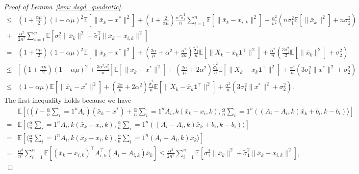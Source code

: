 \documentclass{article}
\theoremstyle{plain}
\theoremstyle{definition}
\theoremstyle{remark}
\newcommand{\E}{\mathbb{E}}
\newcommand{\T}{^{\top}}
\newcommand{\bfonet}{\mathbf{1}^{\top}}
\def\<#1,#2>{\langle #1,#2\rangle}
\begin{document}
\begin{proof}[Proof of Lemma~\ref{lem: dsgd_quadratic}]
\begin{align*}
        \leq &\left(1+\frac{\alpha\mu}{2}\right)(1-\alpha\mu)^2\E\left[\|\bar{x}_k - x^*\|^2\right] + \left(1+\frac{2}{\alpha\mu}\right)\frac{\alpha^2\tilde{\sigma}_1^2}{n}\sum_{i=1}^{n}\E\left[\|\bar{x}_k - x_{i,k}\|^2\right] + \frac{\alpha^2}{n^2}(n\sigma_1^2\E\left[\|\bar{x}_k\|^2\right] + n\sigma_2^2) \\
        + & \frac{\alpha^2}{2n^2}\sum_{i=1}^{n}\E\left[\sigma_1^2\|\bar{x}_k\|^2 + \tilde{\sigma}_1^2\|\bar{x}_k - x_{i,k}\|^2\right] \\
        = &\left(1+\frac{\alpha\mu}{2}\right)(1-\alpha\mu)^2\E\left[\|\bar{x}_k - x^*\|^2\right] + \left(\frac{2\alpha}{\mu} + \alpha^2 + \frac{\alpha^2}{2n}\right)\frac{\tilde{\sigma}_1^2}{n}\E\left[\|X_k - \bar{x}_k\bfonet\|^2\right] + \frac{\alpha^2}{n}\left(\frac{3\sigma_1^2}{2}\E\left[\|\bar{x}_k\|^2\right] + \sigma_2^2\right) \\
        \leq &\left[\left(1+\frac{\alpha\mu}{2}\right)(1-\alpha\mu)^2 + \frac{3\alpha^2\sigma_1^2}{n}\right]\E\left[\|\bar{x}_k - x^*\|^2\right] + \left(\frac{2\alpha}{\mu} + 2\alpha^2\right)\frac{\tilde{\sigma}_1^2}{n}\E\left[\|X_k - \bar{x}_k\bfonet\|^2\right] + \frac{\alpha^2}{n}(3\sigma_1^2\|x^*\|^2 + \sigma_2^2) \\
        \leq & (1-\alpha\mu)\E\left[\|\bar{x}_k - x^*\|^2\right] + \left(\frac{2\alpha}{\mu} + 2\alpha^2\right)\frac{\tilde{\sigma}_1^2}{n}\E\left[\|X_k - \bar{x}_k\bfonet\|^2\right] + \frac{\alpha^2}{n}(3\sigma_1^2\|x^*\|^2 + \sigma_2^2).
    \end{align*}
    The first inequality holds because we have
    \begin{align*}
        &\E\left[\<\left(I - \frac{\alpha}{n}\sum_{i=1}^{n}A_i\right)(\bar{x}_k - x^*) + \frac{\alpha}{n}\sum_{i=1}^{n}A_{i,k}(\bar{x}_k - x_{i,k}), \frac{\alpha}{n}\sum_{i=1}^{n}((A_i - A_{i,k})\bar{x}_k + b_{i,k} - b_i)> \right] \\
        = &\E\left[\<\frac{\alpha}{n}\sum_{i=1}^{n}A_{i,k}(\bar{x}_k - x_{i,k}), \frac{\alpha}{n}\sum_{i=1}^{n}((A_i - A_{i,k})\bar{x}_k + b_{i,k} - b_i)> \right] \\
        =& \E\left[\< \frac{\alpha}{n}\sum_{i=1}^{n}A_{i,k}(\bar{x}_k - x_{i,k}), \frac{\alpha}{n}\sum_{i=1}^{n}(A_i - A_{i,k})\bar{x}_k> \right] \\
        = & \frac{\alpha^2}{n^2}\sum_{i=1}^{n}\E\left[(\bar{x}_k - x_{i,k})\T A_{i,k}\T(A_i-A_{i,k})\bar{x}_k\right] \leq \frac{\alpha^2}{2n^2}\sum_{i=1}^{n}\E\left[\sigma_1^2\|\bar{x}_k\|^2 + \tilde{\sigma}_1^2\|\bar{x}_k - x_{i,k}\|^2\right],

\end{align*}
\end{proof}
\end{document}
